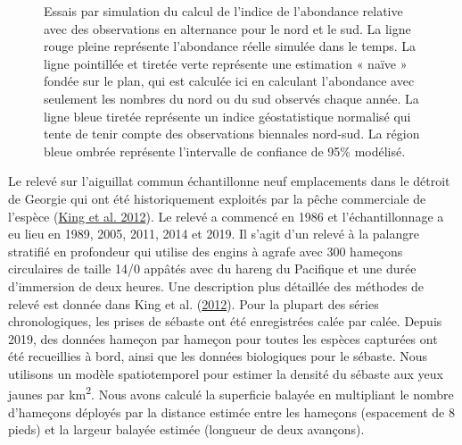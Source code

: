 \documentclass[french,11pt]{book}
\begin{document}
\clearpage
\begin{figure}[htb]

{\centering {} 

}

\caption{Essais par simulation du calcul de l’indice de l’abondance relative avec des observations en alternance pour le nord et le sud. La ligne rouge pleine représente l’abondance réelle simulée dans le temps. La ligne pointillée et tiretée verte représente une estimation « naïve » fondée sur le plan, qui est calculée ici en calculant l’abondance avec seulement les nombres du nord ou du sud observés chaque année. La ligne bleue tiretée représente un indice géostatistique normalisé qui tente de tenir compte des observations biennales nord-sud. La région bleue ombrée représente l’intervalle de confiance de 95\% modélisé.}\label{fig:stich-sim-index}
\end{figure}
\clearpage

\hypertarget{sec:dogfish-index-data}{%
\label{sec:dogfish-index-data}}

Le relevé sur l'aiguillat commun échantillonne neuf emplacements dans le détroit de Georgie qui ont été historiquement exploités par la pêche commerciale de l'espèce (\protect\hyperlink{ref-king2012}{King et al. 2012}). Le relevé a commencé en 1986 et l'échantillonnage a eu lieu en 1989, 2005, 2011, 2014 et 2019. Il s'agit d'un relevé à la palangre stratifié en profondeur qui utilise des engins à agrafe avec 300 hameçons circulaires de taille 14/0 appâtés avec du hareng du Pacifique et une durée d'immersion de deux heures. Une description plus détaillée des méthodes de relevé est donnée dans King et al. (\protect\hyperlink{ref-king2012}{2012}). Pour la plupart des séries chronologiques, les prises de sébaste ont été enregistrées calée par calée. Depuis 2019, des données hameçon par hameçon pour toutes les espèces capturées ont été recueillies à bord, ainsi que les données biologiques pour le sébaste. Nous utilisons un modèle spatiotemporel pour estimer la densité du sébaste aux yeux jaunes par km\textsuperscript{2}. Nous avons calculé la superficie balayée en multipliant le nombre d'hameçons déployés par la distance estimée entre les hameçons (espacement de 8 pieds) et la largeur balayée estimée (longueur de deux avançons).
\end{document}
